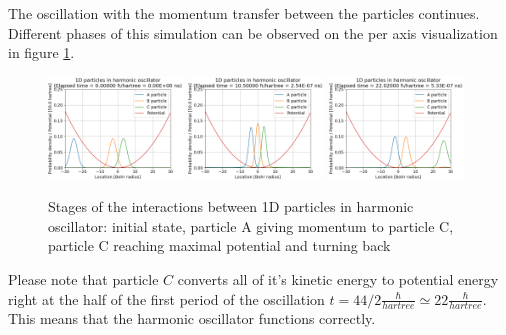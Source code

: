 The oscillation with the momentum transfer between the particles continues.
Different phases of this simulation can be observed on the per axis visualization in figure \ref{fig:1d_particles_in_oscillator_stages}.
\begin{figure}
	\begin{center}
		\includegraphics[width=0.32\textwidth]{figures/1d_oscillator_01.png}
		\includegraphics[width=0.32\textwidth]{figures/1d_oscillator_02.png}
		\includegraphics[width=0.32\textwidth]{figures/1d_oscillator_03.png}
		\caption{Stages of the interactions between 1D particles in harmonic oscillator: initial state, particle A giving momentum to particle C, particle C reaching maximal potential and turning back}
		\label{fig:1d_particles_in_oscillator_stages}
	\end{center}
\end{figure}
Please note that particle $C$ converts all of it's kinetic energy to potential energy right at the half of the first period of the oscillation $t = 44 / 2 \frac{\hbar}{hartree} \simeq 22 \frac{\hbar}{hartree}$.
This means that the harmonic oscillator functions correctly.

